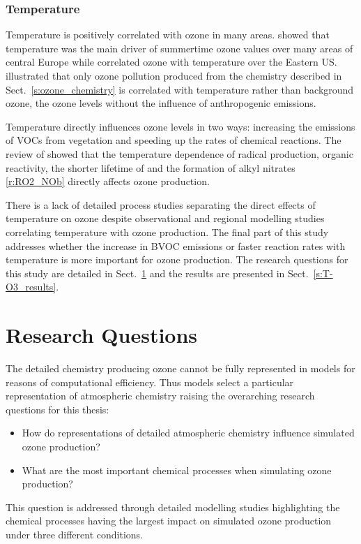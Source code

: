\subsubsection{Temperature}
Temperature is positively correlated with ozone in many areas.
\citet{Otero:2016} showed that temperature was the main driver of summertime ozone values over many areas of central Europe while \citet{Camalier:2007} correlated ozone with temperature over the Eastern US.
\citet{Sillman:1995a} illustrated that only ozone pollution produced from the chemistry described in Sect.~\ref{s:ozone_chemistry} is correlated with temperature rather than background ozone, the ozone levels without the influence of anthropogenic emissions.

Temperature directly influences ozone levels in two ways: increasing the emissions of VOCs from vegetation and speeding up the rates of chemical reactions.
The review of \citet{Pusede:2015} showed that the temperature dependence of radical production, organic reactivity, the shorter lifetime of  and the formation of alkyl nitrates \eqref{r:RO2_NOb} directly affects ozone production.

There is a lack of detailed process studies separating the direct effects of temperature on ozone despite observational and regional modelling studies correlating temperature with ozone production. 
The final part of this study addresses whether the increase in BVOC emissions or faster reaction rates with temperature is more important for ozone production.
The research questions for this study are detailed in Sect.~\ref{s:research_questions} and the results are presented in Sect.~\ref{s:T-O3_results}.

\section{Research Questions} \label{s:research_questions}
The detailed chemistry producing ozone cannot be fully represented in models for reasons of computational efficiency.
Thus models select a particular representation of atmospheric chemistry raising the overarching research questions for this thesis:
\begin{itemize}
    \item How do representations of detailed atmospheric chemistry influence simulated ozone production?
    \item What are the most important chemical processes when simulating ozone production?
\end{itemize}
This question is addressed through detailed modelling studies highlighting the chemical processes having the largest impact on simulated ozone production under three different conditions.

